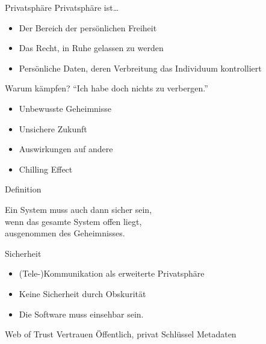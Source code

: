 \documentclass[aspectratio=1610]{beamer}
\begin{document}
  \begin{frame}{Privatsphäre}
    Privatsphäre ist…
    \begin{itemize}
      \pause
      \item Der Bereich der persönlichen Freiheit
      \pause
      \item Das Recht, in Ruhe gelassen zu werden
      \pause
      \item Persönliche Daten, deren Verbreitung das Individuum kontrolliert
    \end{itemize}
  \end{frame}

  \begin{frame}{Warum kämpfen?}
    “Ich habe doch nichts zu verbergen.”
    \begin{itemize}
      \item Unbewusste Geheimnisse
      \item Unsichere Zukunft
      \item Auswirkungen auf andere
      \item Chilling Effect
    \end{itemize}
  \end{frame}

  \begin{frame}{Definition}
    \begin{exampleblock}
      \large{Ein System muss auch dann sicher sein,\\wenn das gesamte System offen liegt,\\ausgenommen des Geheimnisses.}
      \vskip5mm
      \hspace*{}
    \end{exampleblock}
  \end{frame}

  \begin{frame}{Sicherheit}
    \begin{itemize}
      \pause
      \item (Tele-)Kommunikation als erweiterte Privatsphäre
      \pause
      \item Keine Sicherheit durch Obskurität
      \pause
      \item Die Software muss einsehbar sein.
      \pause
    \end{itemize}
  \end{frame}

  Web of Trust
  Vertrauen
  Öffentlich, privat
  Schlüssel
  Metadaten
\end{document}
